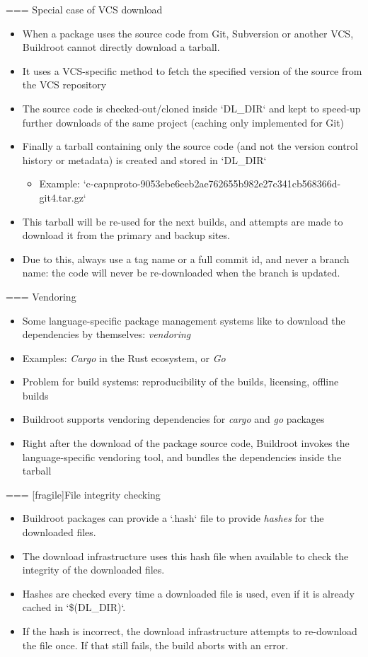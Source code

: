 === {Special case of VCS download}
  \begin{itemize}
  \item When a package uses the source code from Git, Subversion or
    another VCS, Buildroot cannot directly download a tarball.
  \item It uses a VCS-specific method to fetch the specified version
    of the source from the VCS repository
  \item The source code is checked-out/cloned inside `DL_DIR` and
    kept to speed-up further downloads of the same project (caching
    only implemented for Git)
  \item Finally a tarball containing only the source code (and not the
    version control history or metadata) is created and stored in
    `DL_DIR`
    \begin{itemize}
    \item Example: `c-capnproto-9053ebe6eeb2ae762655b982e27c341cb568366d-git4.tar.gz`
    \end{itemize}
  \item This tarball will be re-used for the next builds, and attempts
    are made to download it from the primary and backup sites.
  \item Due to this, always use a tag name or a full commit id, and
    never a branch name: the code will never be re-downloaded when the
    branch is updated.
  \end{itemize}


=== {Vendoring}
  \begin{itemize}
  \item Some language-specific package management systems like to
    download the dependencies by themselves: {\em vendoring}
  \item Examples: {\em Cargo} in the Rust ecosystem, or {\em Go}
  \item Problem for build systems: reproducibility of the builds,
    licensing, offline builds
  \item Buildroot supports vendoring dependencies for {\em cargo} and
    {\em go} packages
  \item Right after the download of the package source code, Buildroot
    invokes the language-specific vendoring tool, and bundles the
    dependencies inside the tarball
  \end{itemize}


=== [fragile]{File integrity checking}
  \begin{itemize}
  \item Buildroot packages can provide a `.hash` file to provide
    {\em hashes} for the downloaded files.
  \item The download infrastructure uses this hash file when available
    to check the integrity of the downloaded files.
  \item Hashes are checked every time a downloaded file is used, even
    if it is already cached in `\$(DL_DIR)`.
  \item If the hash is incorrect, the download infrastructure attempts
    to re-download the file once. If that still fails, the build
    aborts with an error.
  \end{itemize}

